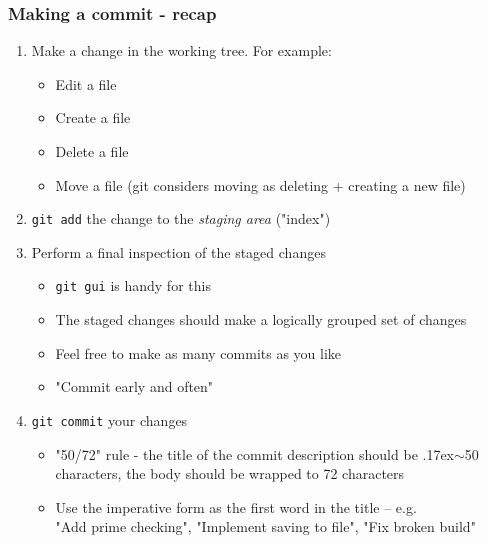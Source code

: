 \begin{frame}[fragile]

\frametitle{Making a commit - recap}
	
\begin{enumerate}
	\item Make a change in the working tree. For example:
	\begin{itemize}
	\item Edit a file
	\item Create a file
	\item Delete a file 
	\item Move a file (git considers moving as deleting + creating a new file)
	\end{itemize}
	\item \texttt {git add} the change to the \textit{staging area} ("index")
	\item Perform a final inspection of the staged changes
	\begin{itemize}
	\item \texttt{git gui} is handy for this
	\item The staged changes should make a logically grouped set of changes
	\item Feel free to make as many commits as you like
	\item "Commit early and often"
	\end{itemize}
	\item \texttt{git commit} your changes
	\begin{itemize}
	\item  "50/72" rule - the title of the commit description should be {\raise.17ex\hbox{$\scriptstyle\sim$}}50 characters, the body should be wrapped to 72 characters
	\item Use the imperative form as the first word in the title -- e.g. \\"Add prime checking", "Implement saving to file", "Fix broken build"
	\end{itemize}
\end{enumerate}
	
\end{frame}



